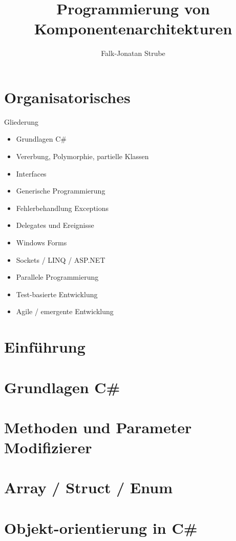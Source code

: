 \documentclass{scrreprt}
\title{Programmierung von Komponentenarchitekturen}
\author{Falk-Jonatan Strube}
\begin{document}
\maketitle
\tableofcontents

\chapter*{Organisatorisches}
Gliederung
\begin{itemize}
\item Grundlagen C\#
\item Vererbung, Polymorphie, partielle Klassen
\item Interfaces
\item Generische Programmierung
\item Fehlerbehandlung Exceptions
\item Delegates und Ereignisse
\item Windows Forms
\item Sockets / LINQ / ASP.NET
\item Parallele Programmierung
\item Test-basierte Entwicklung
\item Agile / emergente Entwicklung 
\end{itemize}

\chapter{Einführung}
%

\chapter{Grundlagen C\#}
%

\chapter{Methoden und Parameter Modifizierer}
%

\chapter{Array / Struct / Enum}
%
 
\chapter{Objekt-orientierung in C\#}
%
\end{document}
